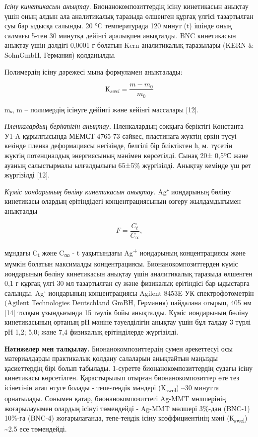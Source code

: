 \begin{multicols}{2}
\emph{Ісіну кинетикасын анықтау}. Бионанокомпозиттердің ісіну
кинетикасын анықтау үшін оның алдын ала аналитикалық таразыда өлшенген
құрғақ үлгісі тазартылған суы бар ыдысқа салынды. 20 °C температурада
120 минут (t) ішінде оның салмағы 5-тен 30 минутқа дейінгі аралықпен
анықталды. BNC кинетикасын анықтау үшін дәлдігі 0,0001 г болатын Kern
аналитикалық таразылары (KERN \& SohnGmbH, Германия) қолданылды.

Полимердің ісіну дәрежесі мына формуламен анықталады:

\begin{equation}
К_{swel} = \frac{m - m_{0}}{m_{0}}
\end{equation}

mₒ, m -- полимердің ісінуге дейінгі және кейінгі массалары {[}12{]}.

\emph{Пленкалардың беріктігін анықтау.} Пленкалардың соққыға беріктігі
Константа У1-A құрылғысында МЕМСТ 4765-73 сәйкес, пластинаға жүктің
еркін түсуі кезінде пленка деформациясы негізінде, белгілі бір
биіктіктен һ, м. түсетін жүктің потенциалдық энергиясының мәнімен
көрсетілді. Сынақ 20± 0,5ºС және ауаның салыстырмалы ылғалдылығы 65±5\%
жүргізілді. Анықтау кемінде үш рет жүргізілді {[}12{]}.

\emph{Күміс иондарының бөліну кинетикасын анықтау.} Ag⁺ иондарының
бөліну кинетикасы олардың ерітіндідегі концентрациясының өзгеру
жылдамдығымен анықталды

\begin{equation}
F = \frac{C_{t}}{C_{\propto}},
\end{equation}

мұндағы C\textsubscript{t} және C\textsubscript{∞} - t уақытындағы
Ag\textsuperscript{+} иондарының концентрациясы және мүмкін болатын
максималды концентрациясы. Бионанокомпозиттерден күміс иондарының бөліну
кинетикасын анықтау үшін аналитикалық таразыда өлшенген 0,1 г құрғақ
үлгі 30 мл тазартылған су және физикалық ерітіндісі бар ыдыстарға
салынды. Ag⁺ иондарының концентрациясы Agilent 8453E УК
спектрофотометрін (Agilent Technologies Deutschland GmBH, Германия)
пайдалана отырып, 405 нм {[}14{]} толқын ұзындығында 15 тәулік бойы
анықталды. Күміс иондарының бөліну кинетикасының ортаның рН мәніне
тәуелділігін анықтау үшін бұл талдау 3 түрлі рН 1,2; 5,0; және 7,4
физикалық ерітінділерде жүргізілді.

{\bfseries Нәтижелер мен талқылау.} Бионанокомпозиттердің сумен әрекеттесуі
осы материалдарды практикалық қолдану салаларын анықтайтын маңызды
қасиеттердің бірі болып табылады. 1-суретте бионанокомпозиттердің судағы
ісіну кинетикасы көрсетілген. Қарастырылып отырған бионанокомпозиттер
өте тез ісінетінін атап өтуге болады - тепе-теңдік мәндері
(К\textsubscript{swel}) \textasciitilde30 минутта орнатылады. Сонымен
қатар, бионанокомпозиттегі Ag-MMT мөлшерінің жоғарылауымен олардың
ісінуі төмендейді - Ag-MMT мөлшері 3\%-дан (BNC-1) 10\%-ға (BNC-4)
жоғарылағанда, тепе-теңдік ісіну коэффициентінің мәні
(К\textsubscript{swel}) \textasciitilde2.5 есе төмендейді.
\end{multicols}

